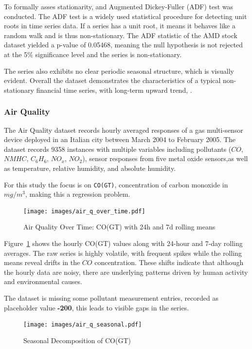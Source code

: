\documentclass[conference]{IEEEtran}
\begin{document}
To formally asses stationarity, and Augmented Dickey-Fuller (ADF) test was conducted. The ADF test is a widely used statistical procedure for detecting unit roots in time series data. If a series has a unit root, it means it behaves like a random walk and is thus non-stationary. The ADF statistic of the AMD stock dataset yielded a p-value of 0.05468, meaning the null hypothesis is not rejected at the 5\% significance level and the series is non-stationary.

The series also exhibits no clear periodic seasonal structure, which is visually evident. Overall the dataset demonstrates the characteristics of a typical non-stationary financial time series, with long-term upward trend, \cite{stock_market_dataset_amd}.

\subsubsection{\textbf{Air Quality}}

The Air Quality dataset records hourly averaged responses of a gas multi-sensor device deployed in an Italian city between March 2004 to February 2005. The dataset records 9358 instances with multiple variables including pollutants ($CO$, $NMHC$, $C_6H_6$, $NO_x$, $NO_2$), sensor responses from five metal oxide sensors,as well as temperature, relative humidity, and absolute humidity.

For this study the focus is on \texttt{CO(GT)}, concentration of carbon monoxide in $mg/m^3$, making this a regression problem.

\begin{figure}[H]
\centering
\texttt{[image: images/air\_q\_over\_time.pdf]}
\caption{Air Quality Over Time: CO(GT) with 24h and 7d rolling means}
\label{fig:air_q_over_time}
\end{figure}

Figure~\ref{fig:air_q_over_time} shows the hourly CO(GT) values along with 24-hour and 7-day rolling averages. The raw series is highly volatile, with frequent spikes while the rolling means reveal drifts in the $CO$ concentration. These shifts indicate that although the hourly data are noisy, there are underlying patterns driven by human activity and environmental causes.

The dataset is missing some pollutant measurement entries, recorded as placeholder value \textbf{-200}, this leads to visible gaps in the series.

\begin{figure}[H]
\centering
\texttt{[image: images/air\_q\_seasonal.pdf]}
\caption{Seasonal Decomposition of CO(GT)}
\label{fig:air_q_seasonal}
\end{figure}
\end{document}

